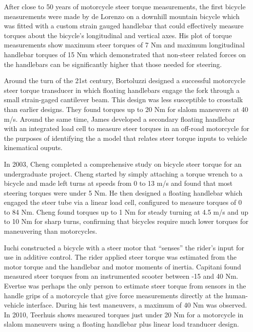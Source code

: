 \documentclass[10pt]{article}
\begin{document}
After close to 50 years of motorcycle steer torque measurements, the first
bicycle measurements were made by de Lorenzo \cite{Lorenzo1997} on a downhill
mountain bicycle which was fitted with a custom strain gauged handlebar that
could effectively measure torques about the bicycle's longitudinal and vertical
axes. His plot of torque measurements show maximum steer torques of 7 Nm and
maximum longitudinal handlebar torques of 15 Nm which demonstrated that
non-steer related forces on the handlebars can be significantly higher that
those needed for steering.

Around the turn of the 21st century, Bortoluzzi \cite{Bortoluzzi2000} designed
a successful motorcycle steer torque transducer in which floating handlebars
engage the fork through a small strain-gaged cantilever beam. This design was
less susceptible to crosstalk than earlier designs. They found torques up to 20
Nm for slalom maneuvers at 40 m/s. Around the same time, James \cite{James2002}
developed a secondary floating handlebar with an integrated load cell to
measure steer torques in an off-road motorcycle for the purposes of identifying
the a model that relates steer torque inputs to vehicle kinematical ouputs.

In 2003, Cheng \cite{Cheng2003} completed a comprehensive study on bicycle
steer torque for an undergraduate project. Cheng started by simply attaching a
torque wrench to a bicycle and made left turns at speeds from 0 to 13 m/s and
found that most steering torques were under 5 Nm. He then designed a floating
handlebar which engaged the steer tube via a linear load cell, configured to
measure torques of 0 to 84 Nm. Cheng found torques up to 1 Nm for steady
turning at 4.5 m/s and up to 10 Nm for sharp turns, confirming that bicycles
require much lower torques for maneuvering than motorcycles.

Iuchi \cite{Iuchi2006} constructed a bicycle with a steer motor that ``senses''
the rider's input for use in additive control. The rider applied steer torque
was estimated from the motor torque and the handlebar and motor moments of
inertia. Capitani \cite{Capitani2006} found measured steer torques from an
instrumented scooter between -15 and 40 Nm. Evertse \cite{Evertse2010} was
perhaps the only person to estimate steer torque from sensors in the handle
grips of a motorcycle that give force measurements directly at the
human-vehicle interface. During his test maneuvers, a maximum of 40 Nm was
observed. In 2010, Teerhuis \cite{Teerhuis2010} shows measured torques just
under 20 Nm for a motorcycle in slalom maneuvers using a floating handlebar
plus linear load tranducer design.
\end{document}
